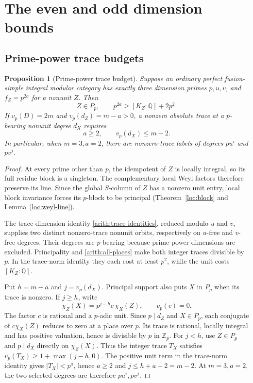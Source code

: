 \documentclass[11pt,a4paper]{article}
\numberwithin{equation}{section}
\newtheorem{proposition}[theorem]{Proposition}
\begin{document}
\section{The even and odd dimension bounds}\label{sec:boundaries}

\subsection{Prime-power trace budgets}

\begin{proposition}[Prime-power trace budget]\label{arith:primepower-trace}
Suppose an ordinary perfect fusion-simple integral modular category has exactly three
dimension primes $p,u,v$, and $f_Z=p^{2a}$ for a nonunit $Z$. Then
\[
 Z\in P_p,\qquad p^{2a}\ge[K_Z:\mathbb Q]+2p^2.
\]
If $v_p(D)=2m$ and $v_p(d_Z)=m-a>0$, a nonzero absolute trace
at a $p$-bearing nonunit degree $d_X$ requires
\[
                    a\ge2,\qquad v_p(d_X)\le m-2.
\]
In particular, when $m=3,a=2$, there are nonzero-trace labels
of degrees $pu^i$ and $pv^j$.
\end{proposition}
\begin{proof}
At every prime other than $p$, the idempotent of $Z$ is
locally integral, so its full residue block is a singleton.
The complementary local Weyl factors therefore preserve its line.
Since the global $S$-column of $Z$ has a nonzero unit entry,
local block invariance forces its $p$-block to be principal
(Theorem~\ref{loc:block} and Lemma~\ref{loc:weyl-line}).

The trace-dimension identity \eqref{arith:trace-identities}, reduced
modulo $u$ and $v$, supplies two distinct nonzero-trace nonunit
orbits, respectively on $u$-free and $v$-free degrees. Their degrees
are $p$-bearing because prime-power dimensions are excluded.
Principality and \eqref{arith:all-places} make both integer traces
divisible by $p$. In the trace-norm identity they each cost at
least $p^2$, while the unit costs $[K_Z:\mathbb Q]$.

Put $h=m-a$ and $j=v_p(d_X)$. Principal support also puts $X$
in $P_p$ when its trace is nonzero. If $j\ge h$, write
\[
             \chi_Z(X)=p^{j-h}c\,\chi_X(Z),\qquad v_p(c)=0.
\]
The factor $c$ is rational and a $p$-adic unit. Since $p\mid d_Z$
and $X\in P_p$, each conjugate of $c\chi_X(Z)$ reduces to zero at a
place over $p$. Its trace is rational, locally integral and has
positive valuation, hence is divisible by $p$ in $\mathbb Z_p$.
For $j<h$, use $Z\in P_p$ and $p\mid d_X$ directly on $\chi_Z(X)$.
Thus the integer trace $T_X$ satisfies
$v_p(T_X)\ge1+\max(j-h,0)$.
The positive unit term in the trace-norm identity gives
$|T_X|<p^a$, hence $a\ge2$ and $j\le h+a-2=m-2$.
At $m=3,a=2$, the two selected degrees are therefore $pu^i,pv^j$.
\end{proof}
\end{document}
